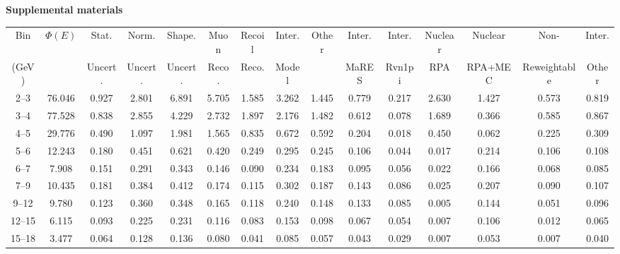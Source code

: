\onecolumngrid

\vspace{1in}
\centerline{\textbf{\Large Supplemental materials}}

\begin{turnpage}
\begin{table}[pht]
   \setlength{\tabcolsep}{4pt}
    \begin{tabular}{ccccc|cccc|cccccc}
    \hline
 Bin & $\Phi(E)$ & 	 Stat.  & 	 Norm. & 	 Shape. & 	 Muon  & 	 Recoil  & 	 Inter.  & 	 Other & Inter. &  	 Inter. &  	 Nuclear &  	 Nuclear &  	 Non- &  	 Inter. \\
 (GeV) 	    &                  & 	Uncert.  & 	 Uncert. & 	 Uncert. 	& 	  Reco. & 	 Reco.  & 	  Model & 	 & MaRES &  Rvn1pi &  	 RPA &  	 RPA+MEC &  	 Reweightable & Other \\
    \hline
 2--3 & 	 76.046 &  	 0.927 &  	 2.801 &  	 6.891 &  	 5.705 &  	 1.585 &  	 3.262 &  	 1.445 &  	 0.779 &  	 0.217 &  	 2.630 &  	 1.427 &  	 0.573 &  	 0.819 \\ 
 3--4 & 	 77.528 &  	 0.838 &  	 2.855 &  	 4.229 &  	 2.732 &  	 1.897 &  	 2.176 &  	 1.482 &  	 0.612 &  	 0.078 &  	 1.689 &  	 0.366 &  	 0.585 &  	 0.867 \\ 
 4--5 & 	 29.776 &  	 0.490 &  	 1.097 &  	 1.981 &  	 1.565 &  	 0.835 &  	 0.672 &  	 0.592 &  	 0.204 &  	 0.018 &  	 0.450 &  	 0.062 &  	 0.225 &  	 0.309 \\ 
 5--6 & 	 12.243 &  	 0.180 &  	 0.451 &  	 0.621 &  	 0.420 &  	 0.249 &  	 0.295 &  	 0.245 &  	 0.106 &  	 0.044 &  	 0.017 &  	 0.214 &  	 0.106 &  	 0.108 \\ 
 6--7 & 	 7.908 &  	 0.151 &  	 0.291 &  	 0.343 &  	 0.146 &  	 0.090 &  	 0.234 &  	 0.183 &  	 0.095 &  	 0.056 &  	 0.022 &  	 0.166 &  	 0.068 &  	 0.085 \\ 
 7--9 & 	 10.435 &  	 0.181 &  	 0.384 &  	 0.412 &  	 0.174 &  	 0.115 &  	 0.302 &  	 0.187 &  	 0.143 &  	 0.086 &  	 0.025 &  	 0.207 &  	 0.090 &  	 0.107 \\ 
 9--12 & 	 9.780 &  	 0.123 &  	 0.360 &  	 0.348 &  	 0.165 &  	 0.118 &  	 0.240 &  	 0.148 &  	 0.133 &  	 0.085 &  	 0.005 &  	 0.144 &  	 0.051 &  	 0.096 \\ 
 12--15 & 	 6.115 &  	 0.093 &  	 0.225 &  	 0.231 &  	 0.116 &  	 0.083 &  	 0.153 &  	 0.098 &  	 0.067 &  	 0.054 &  	 0.007 &  	 0.106 &  	 0.012 &  	 0.065 \\ 
 15--18 & 	 3.477 &  	 0.064 &  	 0.128 &  	 0.136 &  	 0.080 &  	 0.041 &  	 0.085 &  	 0.057 &  	 0.043 &  	 0.029 &  	 0.007 &  	 0.053 &  	 0.007 &  	 0.040 \\ 

\end{tabular}
\end{table}
\end{turnpage}
